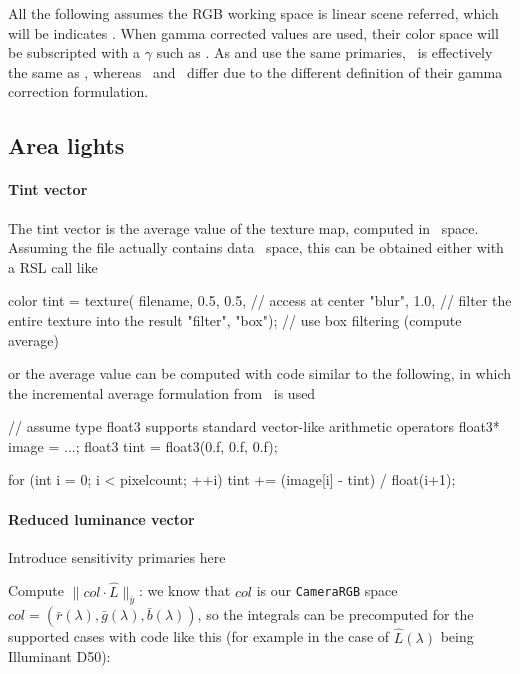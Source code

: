 All the following assumes the \gls{RGB} working space is 
linear scene referred, which will be indicates \sRGBl. When gamma corrected
values are used, their color space will be subscripted with a $\gamma$ such as
\sRGBg. As  and  use the same primaries,
\sRGBl\ is effectively the same as \RecSONl, whereas \sRGBg\ and \RecSONg\
differ due to the different definition of their gamma correction formulation.


\subsection{Area lights}

\paragraph{Tint vector}

The tint vector is the average value of the texture map, computed in \sRGBl\
space. Assuming the file actually contains data \sRGBl\ space, this can be
obtained either with a \gls{RSL} call like

\begin{rslcode}
color tint = texture(
                filename,
                0.5, 0.5,         // access at center
                "blur", 1.0,      // filter the entire texture into the result
                "filter", "box"); // use box filtering (compute average)
\end{rslcode}
or the average value can be computed with code similar to the following, in
which the incremental average formulation from~\cite{knuth97} is used

\begin{c++code}
// assume type float3 supports standard vector-like arithmetic operators
float3* image = ...;
float3 tint = float3(0.f, 0.f, 0.f);

for (int i = 0; i < pixelcount; ++i)
{
    tint += (image[i] - tint) / float(i+1);
}
\end{c++code}

\paragraph{Reduced luminance vector}

Introduce sensitivity primaries here

Compute $\|col\cdot \hat L\|_{\bar y}$: we know that $col$ is
our \texttt{CameraRGB} space $col = (\bar r(\lambda), \bar g(\lambda), \bar b(\lambda))$,
so the integrals can be precomputed for the supported cases with
code like this (for example in the case of $\hat L(\lambda)$ being Illuminant D50):

